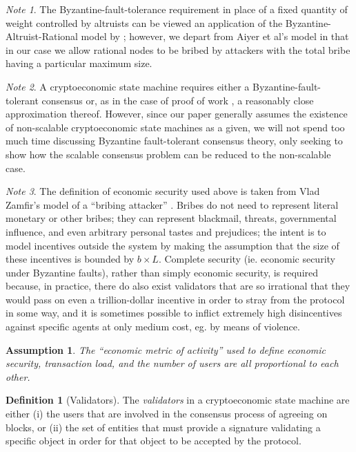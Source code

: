 \documentclass[11pt,a4paper]{report}
\theoremstyle{plain}
\newtheorem{assm}{Assumption}[chapter]
\theoremstyle{definition}
\newtheorem{defn}{Definition}[chapter]
\theoremstyle{remark}
\newtheorem*{note}{Note}
\begin{document}
\begin{note}
The Byzantine-fault-tolerance requirement in place of a fixed quantity of weight controlled by altruists can be viewed an application of the Byzantine-Altruist-Rational model by \cite{aiyer_bar_2005}; however, we depart from Aiyer et al's model in that in our case we allow rational nodes to be bribed by attackers with the total bribe having a particular maximum size.
\end{note}

\begin{note}
A cryptoeconomic state machine requires either a Byzantine-fault-tolerant consensus or, as in the case of proof of work \citep{miller_anonymous_2014}, a reasonably close approximation thereof. However, since our paper generally assumes the existence of non-scalable cryptoeconomic state machines as a given, we will not spend too much time discussing Byzantine fault-tolerant consensus theory, only seeking to show how the scalable consensus problem can be reduced to the non-scalable case.
\end{note}

\begin{note}
The definition of economic security used above is taken from Vlad Zamfir's model of a ``bribing attacker'' \citep{zamfir_formalizing_2015}. Bribes do not need to represent literal monetary or other bribes; they can represent blackmail, threats, governmental influence, and even arbitrary personal tastes and prejudices; the intent is to model incentives outside the system by making the assumption that the size of these incentives is bounded by $b \times  L$. Complete security (ie. economic security under Byzantine faults), rather than simply economic security, is required because, in practice, there do also exist validators that are so irrational that they would pass on even a trillion-dollar incentive in order to stray from the protocol in some way, and it is sometimes possible to inflict extremely high disincentives against specific agents at only medium cost, eg. by means of violence.
\end{note}

\begin{assm}
The ``economic metric of activity'' used to define economic security, transaction load, and the number of users are all proportional to each other.
\end{assm}

\begin{defn}[Validators]
The \emph{validators} in a cryptoeconomic state machine are either (i) the users that are involved in the consensus process of agreeing on blocks, or (ii) the set of entities that must provide a signature validating a specific object in order for that object to be accepted by the protocol.
\end{defn}
\end{document}
